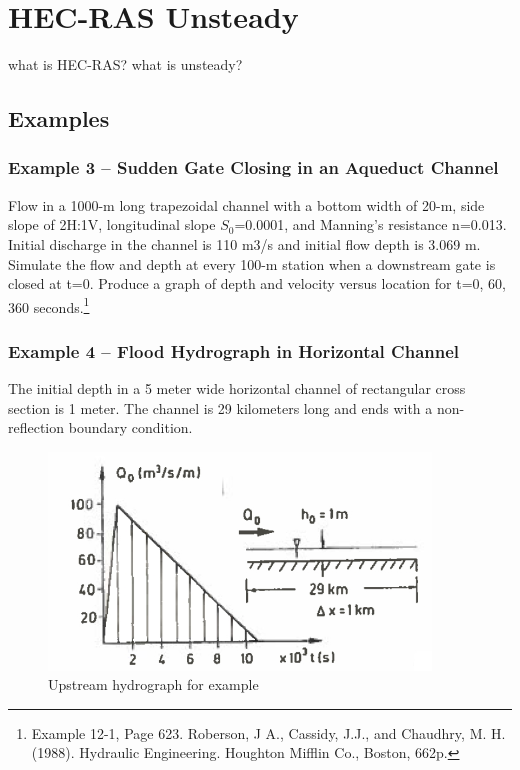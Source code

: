 \section{HEC-RAS Unsteady}
what is HEC-RAS?
what is unsteady?

\subsection{Examples}

\subsubsection{Example 3 -- Sudden Gate Closing in an Aqueduct Channel}
Flow in a 1000-m long trapezoidal channel with a bottom width of 20-m, side slope of 2H:1V, longitudinal slope $S_0$=0.0001, and Manning's resistance n=0.013. 
Initial discharge in the channel is 110 m3/s and initial flow depth is 3.069 m.
Simulate the flow and depth at every 100-m station when a downstream gate is closed at t=0. 
Produce a graph of depth and velocity versus location for t=0, 60, 360 seconds.\footnote{Example 12-1, Page 623. Roberson, J A., Cassidy, J.J., and Chaudhry, M. H. (1988). Hydraulic Engineering. Houghton Mifflin Co., Boston, 662p. }

\subsubsection{Example 4 -- Flood Hydrograph in Horizontal Channel}
The initial depth in a 5 meter wide horizontal channel of rectangular cross section is 1 meter. 
The channel is 29 kilometers long and ends with a non-reflection boundary condition.

\begin{figure}[h!] %
   \centering
   \includegraphics[width=4.0in]{upstreamHydro.jpg} 
   \caption{Upstream hydrograph for example}
   \label{fig:upstreamHydro}
\end{figure}

